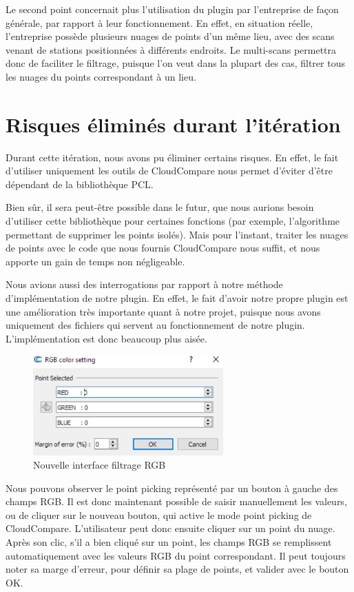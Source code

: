 \documentclass[12pt,titlepage,french]{article}
\begin{document}
Le second point concernait plus l'utilisation du plugin par l'entreprise de façon générale, par rapport à leur fonctionnement. En effet, en situation réelle, l'entreprise possède plusieurs nuages de points d'un même lieu, avec des scans venant de stations positionnées à différents endroits. Le multi-scans permettra donc de faciliter le filtrage, puisque l'on veut dans la plupart des cas, filtrer tous les nuages du points correspondant à un lieu.

\section{Risques éliminés durant l'itération}
Durant cette itération, nous avons pu éliminer certains risques. En effet, le fait d'utiliser uniquement les outils de CloudCompare nous permet d'éviter d'être dépendant de la bibliothèque PCL. \newline

Bien sûr, il sera peut-être possible dans le futur, que nous aurions besoin d'utiliser cette bibliothèque pour certaines fonctions (par exemple, l'algorithme permettant de supprimer les points isolés). Mais pour l'instant, traiter les nuages de points avec le code que nous fournis CloudCompare nous suffit, et nous apporte un gain de temps non négligeable. \newline

Nous avions aussi des interrogations par rapport à notre méthode d'implémentation de notre plugin. En effet, le fait d'avoir notre propre plugin est une amélioration très importante quant à notre projet, puisque nous avons uniquement des fichiers qui servent au fonctionnement de notre plugin. L'implémentation est donc beaucoup plus aisée.

\begin{figure}[!hbtp]
  \caption{\label{} Nouvelle interface filtrage RGB}
  \includegraphics[width=0.65\textwidth]{./img/new_ui.png}
\end{figure}

Nous pouvons observer le point picking représenté par un bouton à gauche des champs RGB. Il est donc maintenant possible de saisir manuellement les valeurs, ou de cliquer sur le nouveau bouton, qui active le mode point picking de CloudCompare. L'utilisateur peut donc ensuite cliquer sur un point du nuage. Après son clic, s'il a bien cliqué sur un point, les champs RGB se remplissent automatiquement avec les valeurs RGB du point correspondant. Il peut toujours noter sa marge d'erreur, pour définir sa plage de points, et valider avec le bouton OK.
\end{document}
